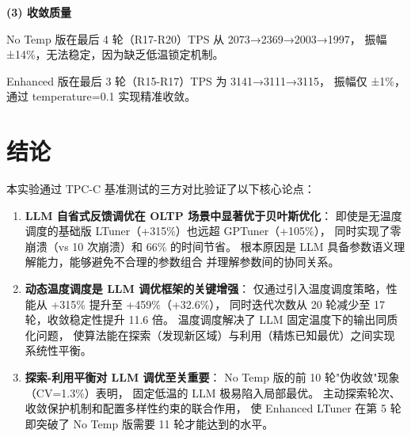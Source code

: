 \textbf{(3) 收敛质量}

No Temp 版在最后 4 轮（R17-R20）TPS 从 2073→2369→2003→1997，
振幅 ±14\%，无法稳定，因为缺乏低温锁定机制。

Enhanced 版在最后 3 轮（R15-R17）TPS 为 3141→3111→3115，
振幅仅 ±1\%，通过 temperature=0.1 实现精准收敛。



\section{结论}

本实验通过 TPC-C 基准测试的三方对比验证了以下核心论点：

\begin{enumerate}
  \item \textbf{LLM 自省式反馈调优在 OLTP 场景中显著优于贝叶斯优化}：
        即使是无温度调度的基础版 LTuner（+315\%）也远超 GPTuner（+105\%），
        同时实现了零崩溃（vs 10 次崩溃）和 66\% 的时间节省。
        根本原因是 LLM 具备参数语义理解能力，能够避免不合理的参数组合
        并理解参数间的协同关系。

  \item \textbf{动态温度调度是 LLM 调优框架的关键增强}：
        仅通过引入温度调度策略，性能从 +315\% 提升至 +459\%（+32.6\%），
        同时迭代次数从 20 轮减少至 17 轮，收敛稳定性提升 11.6 倍。
        温度调度解决了 LLM 固定温度下的输出同质化问题，
        使算法能在探索（发现新区域）与利用（精炼已知最优）之间实现系统性平衡。

  \item \textbf{探索-利用平衡对 LLM 调优至关重要}：
        No Temp 版的前 10 轮"伪收敛"现象（CV=1.3\%）表明，
        固定低温的 LLM 极易陷入局部最优。
        主动探索轮次、收敛保护机制和配置多样性约束的联合作用，
        使 Enhanced LTuner 在第 5 轮即突破了 No Temp 版需要 11 轮才能达到的水平。
\end{enumerate}
